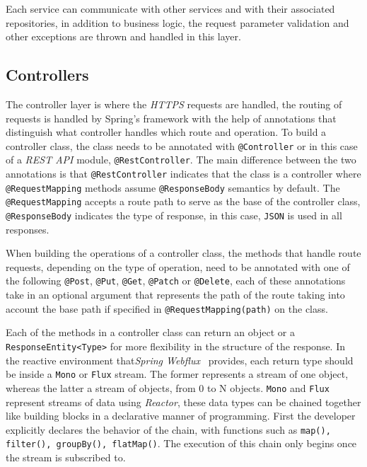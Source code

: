 Each service can communicate with other services and with their associated repositories, in addition to business logic, the request parameter validation and other exceptions are thrown and handled in this layer.

\subsection{Controllers}

The controller layer is where the \textit{HTTPS} requests are handled, the routing of requests is handled by Spring's framework with the help of annotations that distinguish what controller handles which route and operation.
To build a controller class, the class needs to be annotated with \texttt{@Controller} or in this case of a \textit{REST API} module, \texttt{@RestController}. The main difference between the two annotations is that \texttt{@RestController} indicates that the class is a controller where \texttt{@RequestMapping} methods assume \texttt{@ResponseBody} semantics by default.
The \texttt{@RequestMapping} accepts a route path to serve as the base of the controller class, \texttt{@ResponseBody} indicates the type of response, in this case, \texttt{JSON} is used in all responses. 

When building the operations of a controller class, the methods that handle route requests, depending on the type of operation, need to be annotated with one of the following \texttt{@Post}, \texttt{@Put}, \texttt{@Get}, \texttt{@Patch} or \texttt{@Delete}, each of these annotations take in an optional argument that represents the path of the route taking into account the base path if specified in \texttt{@RequestMapping(path)} on the class. 

Each of the methods in a controller class can return an object or a \texttt{ResponseEntity<Type>} for more flexibility in the structure of the response. In the reactive environment that\textit{Spring Webflux}~\cite{spring-webflux} provides, each return type should be inside a \texttt{Mono} or \texttt{Flux} stream.
The former represents a stream of one object, whereas the latter a stream of objects, from 0 to N objects. \texttt{Mono} and \texttt{Flux} represent streams of data using \textit{Reactor}, these data types can be chained together like building blocks in a declarative manner of programming. First the developer explicitly declares the behavior of the chain, with functions such as \texttt{map(), filter(), groupBy(), flatMap()}. The execution of this chain only begins once the stream is subscribed to. 

